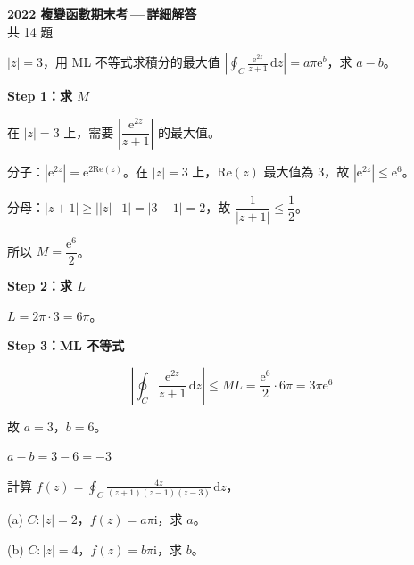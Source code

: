 \documentclass[12pt,a4paper]{article}
\newcommand{\dd}{\,\mathrm{d}}
\newcommand{\ii}{\mathrm{i}}
\newcommand{\ee}{\mathrm{e}}
\begin{document}
\begin{center}
{\LARGE\bfseries 2022 複變函數期末考\,---\,詳細解答}\\[6pt]
{\large 共 14 題}\\[4pt]
\end{center}

\bigskip

\begin{qbox}[第 1 題]
$|z|=3$，用 ML 不等式求積分的最大值 $\displaystyle\left|\oint_C\frac{\ee^{2z}}{z+1}\dd{z}\right|=a\pi\ee^b$，求 $a-b$。
\end{qbox}

\begin{solbox}[解]
\textbf{Step 1：求 $M$}

在 $|z|=3$ 上，需要 $\left|\dfrac{\ee^{2z}}{z+1}\right|$ 的最大值。

分子：$|\ee^{2z}|=\ee^{2\text{Re}(z)}$。在 $|z|=3$ 上，$\text{Re}(z)$ 最大值為 $3$，故 $|\ee^{2z}|\le\ee^6$。

分母：$|z+1|\ge||z|-1|=|3-1|=2$，故 $\dfrac{1}{|z+1|}\le\dfrac{1}{2}$。

所以 $M=\dfrac{\ee^6}{2}$。

\textbf{Step 2：求 $L$}

$L=2\pi\cdot 3=6\pi$。

\textbf{Step 3：ML 不等式}

$$\left|\oint_C\frac{\ee^{2z}}{z+1}\dd{z}\right|\le ML=\frac{\ee^6}{2}\cdot 6\pi=3\pi\ee^6$$

故 $a=3$，$b=6$。
\end{solbox}

\begin{ansbox}
$a-b=3-6=\boxed{-3}$
\end{ansbox}

\begin{qbox}[第 2 題]
計算 $\displaystyle f(z)=\oint_C\frac{4z}{(z+1)(z-1)(z-3)}\dd{z}$，

(a) $C:|z|=2$，$f(z)=a\pi\ii$，求 $a$。

(b) $C:|z|=4$，$f(z)=b\pi\ii$，求 $b$。
\end{qbox}
\end{document}

